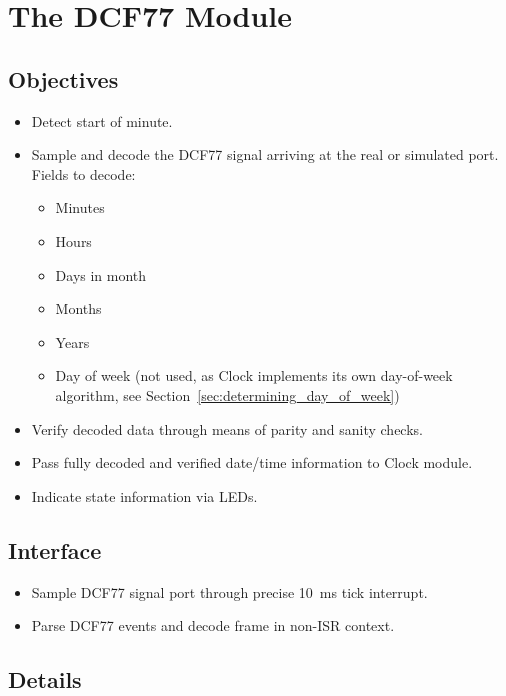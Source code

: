 \chapter{The DCF77 Module}

\section{Objectives}

\begin{itemize}
    \item Detect start of minute.
    \item Sample and decode the DCF77 signal arriving at the real or simulated port. Fields to decode:
          \begin{itemize}
              \item Minutes
              \item Hours
              \item Days in month
              \item Months
              \item Years
              \item Day of week (not used, as Clock implements its own day-of-week algorithm, see Section~\ref{sec:determining_day_of_week})
          \end{itemize}
    \item Verify decoded data through means of parity and sanity checks.
    \item Pass fully decoded and verified date/time information to Clock module.
    \item Indicate state information via LEDs.
\end{itemize}

\section{Interface}

\begin{itemize}
    \item Sample DCF77 signal port through precise \SI{10}{\milli\second} tick interrupt.
    \item Parse DCF77 events and decode frame in non-ISR context.
\end{itemize}

\section{Details}

